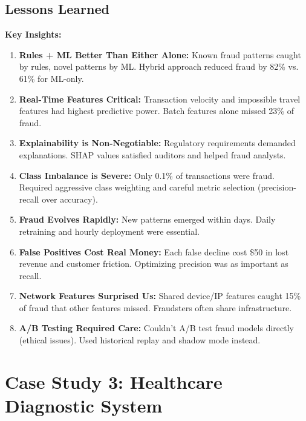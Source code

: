 \subsection{Lessons Learned}

\textbf{Key Insights:}

\begin{enumerate}
    \item \textbf{Rules + ML Better Than Either Alone:} Known fraud patterns caught by rules, novel patterns by ML. Hybrid approach reduced fraud by 82\% vs. 61\% for ML-only.

    \item \textbf{Real-Time Features Critical:} Transaction velocity and impossible travel features had highest predictive power. Batch features alone missed 23\% of fraud.

    \item \textbf{Explainability is Non-Negotiable:} Regulatory requirements demanded explanations. SHAP values satisfied auditors and helped fraud analysts.

    \item \textbf{Class Imbalance is Severe:} Only 0.1\% of transactions were fraud. Required aggressive class weighting and careful metric selection (precision-recall over accuracy).

    \item \textbf{Fraud Evolves Rapidly:} New patterns emerged within days. Daily retraining and hourly deployment were essential.

    \item \textbf{False Positives Cost Real Money:} Each false decline cost \$50 in lost revenue and customer friction. Optimizing precision was as important as recall.

    \item \textbf{Network Features Surprised Us:} Shared device/IP features caught 15\% of fraud that other features missed. Fraudsters often share infrastructure.

    \item \textbf{A/B Testing Required Care:} Couldn't A/B test fraud models directly (ethical issues). Used historical replay and shadow mode instead.
\end{enumerate}

\section{Case Study 3: Healthcare Diagnostic System}

